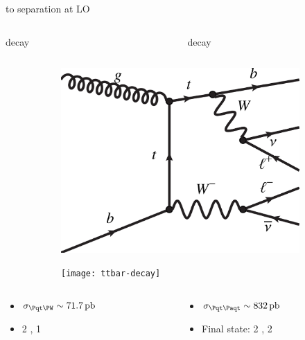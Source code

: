 \begin{frame}{\tW to \ttbar separation at LO}
\begin{columns}
\quad
    \begin{column}{0.45\textwidth}
    \begin{block}{\tW decay}
    \end{block}
    \end{column}
    \quad
    \begin{column}{0.45\textwidth}
    \begin{block}{\ttbar decay}
    \end{block}
    \end{column}
\quad
\end{columns}
    \begin{figure}[htbp]
    \centering
    \begin{subfigure}[b]{0.4\textwidth}
        \includegraphics[width=\textwidth]{feynman_diagrams/tW-decay.pdf}
        \label{fig:nlo:tw}
    \end{subfigure}
\quad
    \begin{subfigure}[b]{0.4\textwidth}
        \texttt{[image: ttbar-decay]}
        \label{fig:nlo:ttbar}
    \end{subfigure}
\end{figure}
\begin{columns}
\quad
    \begin{column}{0.45\textwidth}
	\begin{itemize}
	\item $\sigma_{\tW} \sim \SI{71.7}{\pico\barn}$
	\item 2 \PW, 1 \Pbottom
	\end{itemize}
    \end{column}
    \quad
    \begin{column}{0.45\textwidth}
	\begin{itemize}
	\item $\sigma_{\ttbar} \sim \SI{832}{\pico\barn}$
	\item Final state: 2 \PW, 2 \Pbottom
	\end{itemize}
    \end{column}
\quad
\end{columns}
\end{frame}

